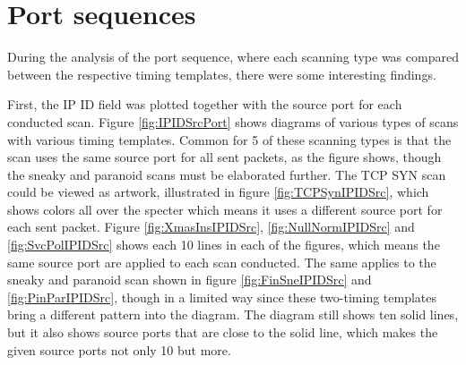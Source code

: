 \section{Port sequences}
\label{s:PortSequences}

During the analysis of the port sequence, where each scanning type was compared between the respective timing templates, there were some interesting findings.

First, the IP ID field was plotted together with the source port for each conducted scan.
Figure \ref{fig:IPIDSrcPort} shows diagrams of various types of scans with various timing templates.
Common for 5 of these scanning types is that the scan uses the same source port for all sent packets, as the figure shows, though the sneaky and paranoid scans must be elaborated further.
The TCP SYN scan could be viewed as artwork, illustrated in figure \ref{fig:TCPSynIPIDSrc}, which shows colors all over the specter which means it uses a different source port for each sent packet.
Figure \ref{fig:XmasInsIPIDSrc}, \ref{fig:NullNormIPIDSrc} and \ref{fig:SvcPolIPIDSrc} shows each 10 lines in each of the figures, which means the same source port are applied to each scan conducted.
The same applies to the sneaky and paranoid scan shown in figure \ref{fig:FinSneIPIDSrc} and \ref{fig:PinParIPIDSrc}, though in a limited way since these two-timing templates bring a different pattern into the diagram. The diagram still shows ten solid lines, but it also shows source ports that are close to the solid line, which makes the given source ports not only 10 but more.



